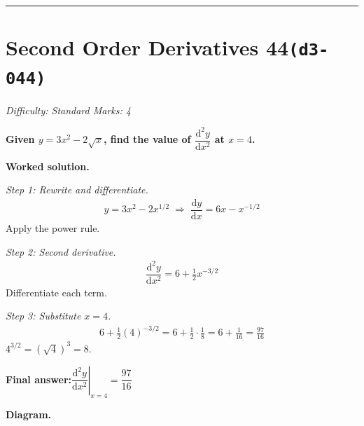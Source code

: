 \documentclass[11pt]{article}
\newcommand{\question}[1]{\par\medskip\noindent\textbf{#1}\par}
\begin{document}
\medskip\hrule

\section*{Second Order Derivatives 44\quad\small\texttt{(d3-044)}}
\textit{Difficulty: Standard \quad\textbar\quad Marks: 4}

\question{Given \( y = 3x^2 - 2\sqrt{x} \), find the value of \( \dfrac{\mathrm{d}^2y}{\mathrm{d}x^2} \) at \( x = 4 \).}

\textbf{Worked solution.}

\textit{Step 1: Rewrite and differentiate.}
\[\begin{gathered}
y = 3x^2 - 2x^{1/2} \;\Rightarrow\; \dfrac{\mathrm{d}y}{\mathrm{d}x} = 6x - x^{-1/2}
\end{gathered}\]
Apply the power rule.

\textit{Step 2: Second derivative.}
\[\begin{gathered}
\dfrac{\mathrm{d}^2y}{\mathrm{d}x^2} = 6 + \tfrac{1}{2}x^{-3/2}
\end{gathered}\]
Differentiate each term.

\textit{Step 3: Substitute \( x = 4 \).}
\[\begin{gathered}
6 + \tfrac{1}{2}(4)^{-3/2} = 6 + \tfrac{1}{2} \cdot \tfrac{1}{8} = 6 + \tfrac{1}{16} = \tfrac{97}{16}
\end{gathered}\]
\( 4^{3/2} = (\sqrt{4})^3 = 8 \).

\begin{answerbox}
\textbf{Final answer:}\quad \(\displaystyle  \left.\dfrac{\mathrm{d}^2y}{\mathrm{d}x^2}\right|_{x=4} = \dfrac{97}{16} \)
\end{answerbox}
\textbf{Diagram.}
\end{document}
